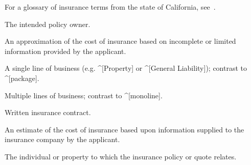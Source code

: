 %
%


For a glossary of insurance terms from the state of California,
see~\cite{gls-ins-calif}.

\begin{description}
  The intended policy owner.

  An approximation of the cost of insurance based on incomplete or limited
  information provided by the applicant.

  A single line of business (e.g. ^[Property] or ^[General Liability]); contrast
  to ^[package].

  Multiple lines of business; contrast to ^[monoline].

  Written insurance contract.

  An estimate of the cost of insurance based upon information supplied to the
  insurance company by the applicant.

  The individual or property to which the insurance policy or quote relates.
\end{description}

\enddeptgroup
